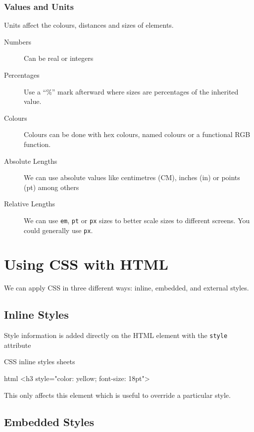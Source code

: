 \subsubsection{Values and Units}\label{ssub:values_and_units}

Units affect the colours, distances and sizes of elements.
\begin{description}
	\item[Numbers] Can be real or integers
	\item[Percentages] Use a ``\%'' mark afterward where sizes are percentages of the inherited value.
	\item[Colours] Colours can be done with hex colours, named colours or a functional RGB function.
	\item[Absolute Lengths] We can use absolute values like centimetres (CM), inches (in) or points (pt) among others
	\item[Relative Lengths] We can use \texttt{em}, \texttt{pt} or \texttt{px} sizes to better scale sizes to different screens.
	      You could generally use \texttt{px}.
\end{description}

\section{Using CSS with HTML}\label{sec:using_css_with_html}

We can apply CSS in three different ways: inline, embedded, and external styles.

\subsection{Inline Styles}\label{sub:inline_styles}

Style information is added directly on the HTML element with the \texttt{style} attribute
\begin{highlight}{CSS inline styles sheets}
	\begin{code}{html}
		<h3 style="color: yellow; font-size: 18pt">
	\end{code}
\end{highlight}
This only affects this element which is useful to override a particular style.

\subsection{Embedded Styles}\label{sub:embedded_styles}

